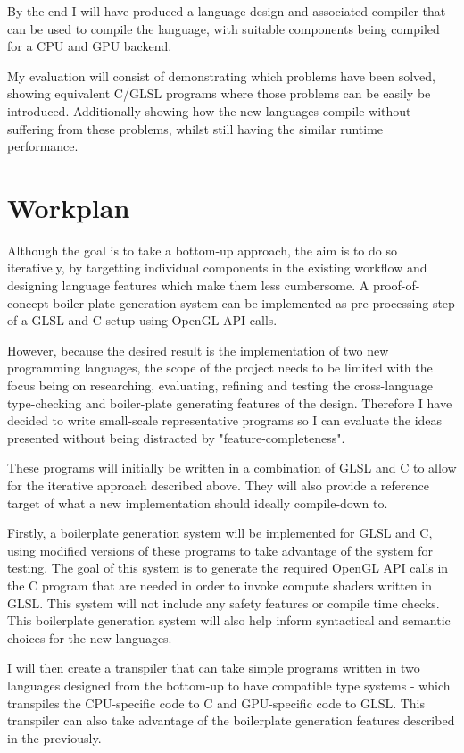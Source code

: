 \documentclass[11pt]{article}
\begin{document}
By the end I will have produced a language design and associated compiler that
can be used to compile the language, with suitable components being compiled
for a CPU and GPU backend.

My evaluation will consist of demonstrating which problems have been solved,
showing equivalent C/GLSL programs where those problems can be easily be
introduced. Additionally showing how the new languages compile without
suffering from these problems, whilst still having the similar runtime
performance.

\section{Workplan}

Although the goal is to take a bottom-up approach, the aim is to do so
iteratively, by targetting individual components in the existing workflow and
designing language features which make them less cumbersome. A proof-of-concept
boiler-plate generation system can be implemented as pre-processing step of a
GLSL and C setup using OpenGL API calls.

However, because the desired result is the implementation of two new
programming languages, the scope of the project needs to be limited with the
focus being on researching, evaluating, refining and testing the cross-language
type-checking and boiler-plate generating features of the design. Therefore I
have decided to write small-scale representative programs so I can evaluate the
ideas presented without being distracted by "feature-completeness".

These programs will initially be written in a combination of GLSL and C to
allow for the iterative approach described above. They will also provide a
reference target of what a new implementation should ideally compile-down to.

Firstly, a boilerplate generation system will be implemented for GLSL and C,
using modified versions of these programs to take advantage of the system for
testing. The goal of this system is to generate the required OpenGL API calls
in the C program that are needed in order to invoke compute shaders written in
GLSL. This system will not include any safety features or compile time checks.
This boilerplate generation system will also help inform syntactical and
semantic choices for the new languages.

I will then create a transpiler that can take simple programs written in two
languages designed from the bottom-up to have compatible type systems - which
transpiles the CPU-specific code to C and GPU-specific code to GLSL. This
transpiler can also take advantage of the boilerplate generation features
described in the previously.
\end{document}
